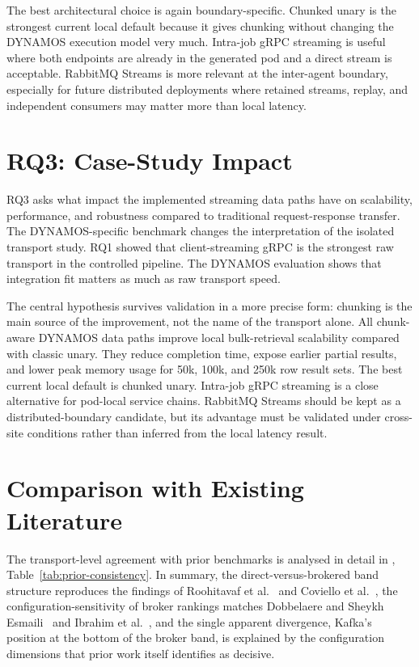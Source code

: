 The best architectural choice is again boundary-specific. Chunked unary is the strongest current local default because it gives chunking without changing the DYNAMOS execution model very much. Intra-job gRPC streaming is useful where both endpoints are already in the generated pod and a direct stream is acceptable. RabbitMQ Streams is more relevant at the inter-agent boundary, especially for future distributed deployments where retained streams, replay, and independent consumers may matter more than local latency.

\section{RQ3: Case-Study Impact}\label{sec:discussion-rq3}

RQ3 asks what impact the implemented streaming data paths have on scalability, performance, and robustness compared to traditional request-response transfer. The DYNAMOS-specific benchmark changes the interpretation of the isolated transport study. RQ1 showed that client-streaming gRPC is the strongest raw transport in the controlled pipeline. The DYNAMOS evaluation shows that integration fit matters as much as raw transport speed.

The central hypothesis survives validation in a more precise form: chunking is the main source of the improvement, not the name of the transport alone. All chunk-aware DYNAMOS data paths improve local bulk-retrieval scalability compared with classic unary. They reduce completion time, expose earlier partial results, and lower peak memory usage for 50k, 100k, and 250k row result sets. The best current local default is chunked unary. Intra-job gRPC streaming is a close alternative for pod-local service chains. RabbitMQ Streams should be kept as a distributed-boundary candidate, but its advantage must be validated under cross-site conditions rather than inferred from the local latency result.

\section{Comparison with Existing Literature}\label{sec:discussion-literature}

The transport-level agreement with prior benchmarks is analysed in detail in , Table~\ref{tab:prior-consistency}. In summary, the direct-versus-brokered band structure reproduces the findings of Roohitavaf et al.~\cite{roohitavaf2019logplayer} and Coviello et al.~\cite{coviello2022dataxc}, the configuration-sensitivity of broker rankings matches Dobbelaere and Sheykh Esmaili~\cite{dobbelaere2017kafkarabbitmq} and Ibrahim et al.~\cite{ibrahim2026brokers}, and the single apparent divergence, Kafka's position at the bottom of the broker band, is explained by the configuration dimensions that prior work itself identifies as decisive.

